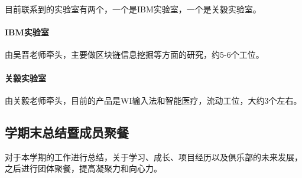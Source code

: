 \documentclass{club}
\begin{document}
目前联系到的实验室有两个，一个是IBM实验室，一个是关毅实验室。

\paragraph{IBM实验室}由吴晋老师牵头，主要做区块链信息挖掘等方面的研究，约5-6个工位。
\paragraph{关毅实验室}由关毅老师牵头，目前的产品是WI输入法和智能医疗，流动工位，大约3个左右。

\subsection{学期末总结暨成员聚餐}

对于本学期的工作进行总结，关于学习、成长、项目经历以及俱乐部的未来发展，之后进行团体聚餐，提高凝聚力和向心力。


\end{document}
